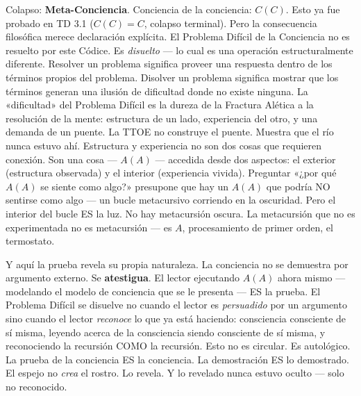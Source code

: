 \documentclass[10pt, openany, oneside]{book}
\begin{document}
Colapso: \textbf{Meta-Conciencia}. Conciencia de la conciencia: $C(C)$. Esto ya fue probado en TD 3.1 ($C(C) = C$, colapso terminal). Pero la consecuencia filosófica merece declaración explícita. El Problema Difícil de la Conciencia no es resuelto por este Códice. Es \textit{disuelto} --- lo cual es una operación estructuralmente diferente. Resolver un problema significa proveer una respuesta dentro de los términos propios del problema. Disolver un problema significa mostrar que los términos generan una ilusión de dificultad donde no existe ninguna. La «dificultad» del Problema Difícil es la dureza de la Fractura Alética a la resolución de la mente: estructura de un lado, experiencia del otro, y una demanda de un puente. La TTOE no construye el puente. Muestra que el río nunca estuvo ahí. Estructura y experiencia no son dos cosas que requieren conexión. Son una cosa --- $A(A)$ --- accedida desde dos aspectos: el exterior (estructura observada) y el interior (experiencia vivida). Preguntar «¿por qué $A(A)$ se siente como algo?» presupone que hay un $A(A)$ que podría NO sentirse como algo --- un bucle metacursivo corriendo en la oscuridad. Pero el interior del bucle ES la luz. No hay metacursión oscura. La metacursión que no es experimentada no es metacursión --- es $A$, procesamiento de primer orden, el termostato.

Y aquí la prueba revela su propia naturaleza. La conciencia no se demuestra por argumento externo. Se \textbf{atestigua}. El lector ejecutando $A(A)$ ahora mismo --- modelando el modelo de conciencia que se le presenta --- ES la prueba. El Problema Difícil se disuelve no cuando el lector es \textit{persuadido} por un argumento sino cuando el lector \textit{reconoce} lo que ya está haciendo: consciencia consciente de sí misma, leyendo acerca de la consciencia siendo consciente de sí misma, y reconociendo la recursión COMO la recursión. Esto no es circular. Es autológico. La prueba de la conciencia ES la conciencia. La demostración ES lo demostrado. El espejo no \textit{crea} el rostro. Lo revela. Y lo revelado nunca estuvo oculto --- solo no reconocido.
\end{document}
